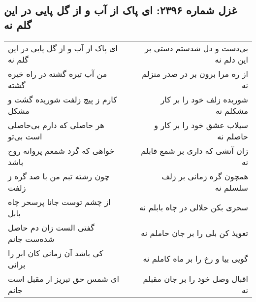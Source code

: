 \begin{center}
\section*{غزل شماره ۲۳۹۶: ای پاک از آب و از گل پایی در این گلم نه}
\label{sec:2396}
\begin{longtable}{l p{0.5cm} r}
ای پاک از آب و از گل پایی در این گلم نه
&&
بی‌دست و دل شدستم دستی بر این دلم نه
\\
من آب تیره گشته در راه خیره گشته
&&
از ره مرا برون بر در صدر منزلم نه
\\
کارم ز پیچ زلفت شوریده گشت و مشکل
&&
شوریده زلف خود را بر کار مشکلم نه
\\
هر حاصلی که دارم بی‌حاصلی است بی‌تو
&&
سیلاب عشق خود را بر کار و حاصلم نه
\\
خواهی که گرد شمعم پروانه روح باشد
&&
زان آتشی که داری بر شمع قابلم نه
\\
چون رشته تبم من با صد گره ز زلفت
&&
همچون گره زمانی بر زلف سلسلم نه
\\
از چشم توست جانا پرسحر چاه بابل
&&
سحری بکن حلالی در چاه بابلم نه
\\
گفتی الست زان دم حاصل شده‌ست جانم
&&
تعویذ کن بلی را بر جان حاملم نه
\\
کی باشد آن زمانی کان ابر را برانی
&&
گویی بیا و رخ را بر ماه کاملم نه
\\
ای شمس حق تبریز ار مقبل است جانم
&&
اقبال وصل خود را بر جان مقبلم نه
\\
\end{longtable}
\end{center}
